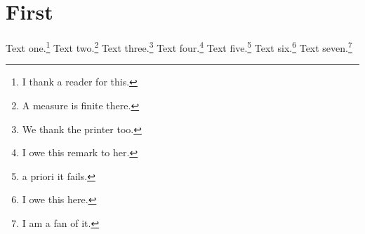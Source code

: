 \documentclass{scrreprt}
\begin{document}
\chapter{First}
Text one.\footnote{I thank a reader for this.}
Text two.\footnote{A measure is finite there.}
Text three.\footnote{We thank the printer too.}
Text four.\footnote[9]{I owe this remark to her.}
Text five.\footnote{a priori it fails.}
Text six.\footnote[20]{I owe this here.}
Text seven.\footnote[1000]{I am a fan of it.}
\end{document}
